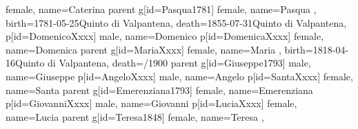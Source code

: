 \documentclass{article}
\begin{document}
\begin{midpage}
\begin{center}
\begin{genealogypicture}
{{{{{{{{{                                    female,
                                    name={Caterina }
                                }
                            }
                        }
                        parent{
                            g[id=Pasqua1781]{
                                female,
                                name={Pasqua },
                                birth={1781-05-25}{Quinto di Valpantena},
                                death={1855-07-31}{Quinto di Valpantena},
                            }
                            p[id=DomenicoXxxx]{
                                male,
                                name={Domenico }
                            }
                            p[id=DomenicaXxxx]{
                                female,
                                name={Domenica}
                            }
                        }
                    }
                    parent{
                        g[id=MariaXxxx]{
                            female,
                            name={Maria },
                            birth={1818-04-16}{Quinto di Valpantena},
                            death={/1900}{}
                        }
                        parent{
                            g[id=Giuseppe1793]{
                                male,
                                name={Giuseppe }
                            }
                            p[id=AngeloXxxx]{
                                male,
                                name={Angelo }
                            }
                            p[id=SantaXxxx]{
                                female,
                                name={Santa}
                            }
                        }
                        parent{
                            g[id=Emerenziana1793]{
                                female,
                                name={Emerenziana }
                            }
                            p[id=GiovanniXxxx]{
                                male,
                                name={Giovanni }
                            }
                            p[id=LuciaXxxx]{
                                female,
                                name={Lucia }
                            }
                        }
                    }
                }
                parent{
                    g[id=Teresa1848]{
                        female,
                        name={Teresa },
}}}}}}
\end{genealogypicture}
\end{center}
\end{midpage}
\end{document}
